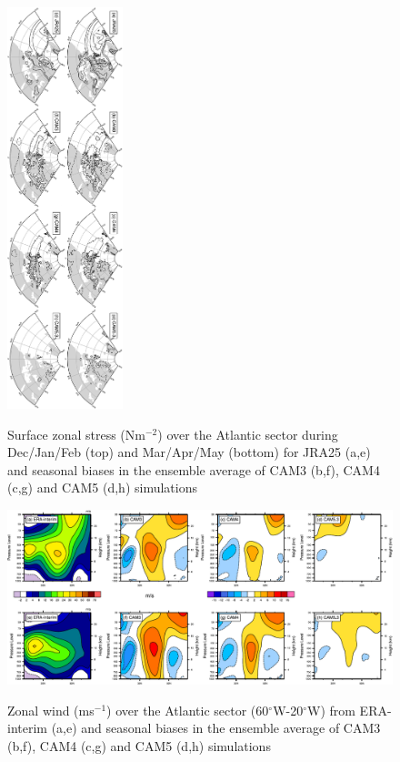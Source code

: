 \documentclass[12pt,varwidth]{article}
\def\deg{$^\circ$}
\begin{document}
\begin{figure}[t]
  \begin{center}
    \noindent\includegraphics[width=0.3\textwidth,angle=90.]{./figs/f_mean_TAUX_atl.pdf}\\
  \end{center}
  \caption{Surface zonal stress (Nm$^{-2}$) over the Atlantic sector during Dec/Jan/Feb (top) and Mar/Apr/May (bottom) for JRA25 (a,e) and seasonal biases in the ensemble average of CAM3 (b,f), CAM4 (c,g) and CAM5 (d,h) simulations}
\label{f_mean_TAUX_atl}
\end{figure}

\begin{figure}[t]
  \begin{center}
    \noindent\includegraphics[width=1.0\textwidth,angle=0.]{./figs/f_U_atl.pdf}\\
  \end{center}
  \caption{Zonal wind (ms$^{-1}$) over the Atlantic sector (60\deg W-20\deg W) from ERA-interim (a,e) and seasonal biases in the ensemble average of CAM3 (b,f), CAM4 (c,g) and CAM5 (d,h) simulations}
\label{f_U_atl}
\end{figure}
\end{document}
